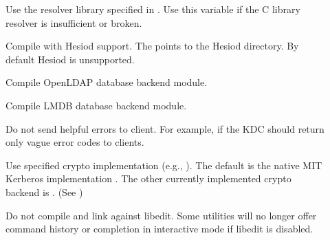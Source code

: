 \documentclass[letterpaper,10pt,english]{sphinxmanual}
\begin{document}
\begin{description}
\item[{\sphinxstylestrong{\sphinxhyphen{}}}] \leavevmode
\sphinxAtStartPar
Use the resolver library specified in .  Use this variable
if the C library resolver is insufficient or broken.

\item[{\sphinxstylestrong{\sphinxhyphen{}}}] \leavevmode
\sphinxAtStartPar
Compile with Hesiod support.  The  points to the Hesiod
directory.  By default Hesiod is unsupported.

\item[{\sphinxstylestrong{\sphinxhyphen{}}}] \leavevmode
\sphinxAtStartPar
Compile OpenLDAP database backend module.

\item[{\sphinxstylestrong{\sphinxhyphen{}}}] \leavevmode
\sphinxAtStartPar
Compile LMDB database backend module.

\item[{\sphinxstylestrong{\sphinxhyphen{}}}] \leavevmode
\sphinxAtStartPar
Do not send helpful errors to client.  For example, if the KDC
should return only vague error codes to clients.

\item[{\sphinxstylestrong{\sphinxhyphen{}}}] \leavevmode
\sphinxAtStartPar
Use specified crypto implementation (e.g., \sphinxstylestrong{\sphinxhyphen{}}).  The default is the native MIT
Kerberos implementation .  The other currently
implemented crypto backend is .  (See
)

\item[{\sphinxstylestrong{\sphinxhyphen{}}}] \leavevmode
\sphinxAtStartPar
Do not compile and link against libedit.  Some utilities will no
longer offer command history or completion in interactive mode if
libedit is disabled.


\end{description}
\end{document}
